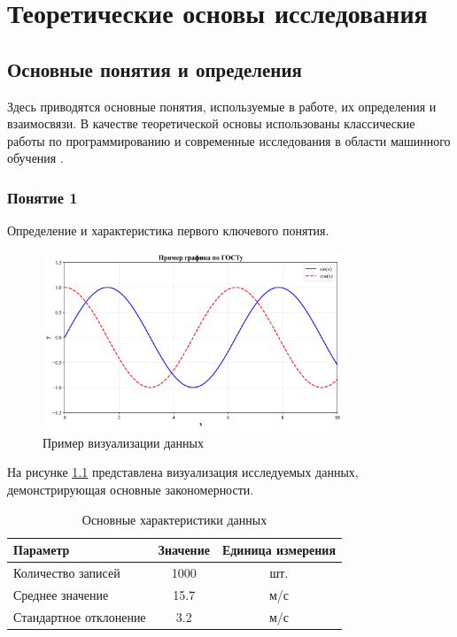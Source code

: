 \chapter{Теоретические основы исследования}

\section{Основные понятия и определения}

Здесь приводятся основные понятия, используемые в работе, их определения и взаимосвязи. В качестве теоретической основы использованы классические работы по программированию \cite{knuth_art} и современные исследования в области машинного обучения \cite{ml_conference}.

\subsection{Понятие 1}

Определение и характеристика первого ключевого понятия.

\begin{figure}[H]
\centering
\includegraphics[width=0.8\textwidth]{images/example_plot.png}
\caption{Пример визуализации данных}
\label{fig:data_visualization}
\end{figure}

На рисунке \ref{fig:data_visualization} представлена визуализация исследуемых данных, демонстрирующая основные закономерности.

\begin{table}[H]
\centering
\caption{Основные характеристики данных}
\label{tab:data_characteristics}
\begin{tabular}{|l|c|c|}
\hline
\textbf{Параметр} & \textbf{Значение} & \textbf{Единица измерения} \\
\hline
Количество записей & 1000 & шт. \\
Среднее значение & 15.7 & м/с \\
Стандартное отклонение & 3.2 & м/с \\
\hline
\end{tabular}
\end{table}

